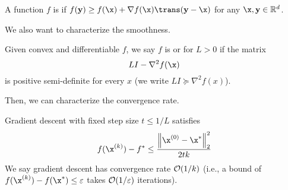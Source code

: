\documentclass[class=cs480,notes,tikz]{agony}
\begin{document}
\begin{defn}[convexity]
  A function $f$ is  if $f(\vb y) \geq f(\x) + \nabla f(\x)\trans(\vb y-\x)$
  for any $\x,\vb y \in \R^d$.
\end{defn}
We also want to characterize the smoothness.
\begin{defn}
  Given convex and differentiable $f$, we say $f$ is 
  or  for $L > 0$ if the matrix
  \[ LI - \nabla^2f(\x) \]
  is positive semi-definite for every $x$ (we write $LI \succeq \nabla^2 f(x)$).
\end{defn}
Then, we can characterize the convergence rate.
\begin{theorem}
  Gradient descent with fixed step size $t \leq 1/L$ satisfies
  \[
    f(\x^{(k)}) - f^* \leq \frac{\norm{\x^{(0)} - \x^*}_2^2}{2tk}
  \]
  We say gradient descent has convergence rate $\order{1/k}$
  (i.e., a bound of $f(\x^{(k)}) - f(\x^*) \leq \varepsilon$
  takes $\order{1/\varepsilon}$ iterations).
\end{theorem}
\end{document}
